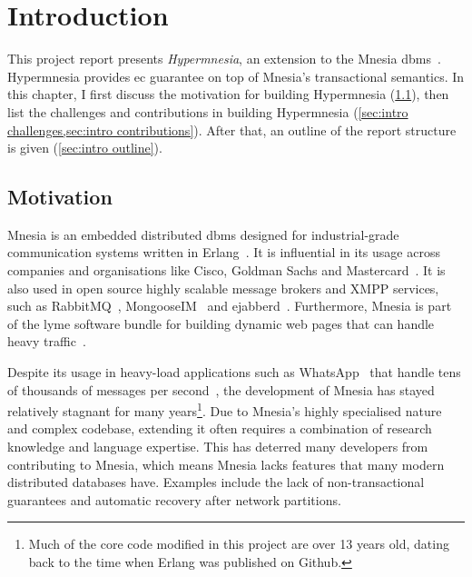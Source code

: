 \section{Introduction} \label{sec:intro}




This project report presents \emph{Hypermnesia}, an extension to the
Mnesia \acrfull{dbms}~\cite{ericssonab2023mnesiaguide}. 
Hypermnesia provides \acrfull{ec} 
guarantee on top of Mnesia's transactional semantics. 
In this chapter, I first discuss the motivation for building 
Hypermnesia (\cref{sec:intro motivation}), then list the challenges and contributions
in building Hypermnesia (\cref{sec:intro challenges,sec:intro contributions}). 
After that, an outline of the report structure is given (\cref{sec:intro outline}).


\subsection{Motivation} \label{sec:intro motivation}

Mnesia is an embedded distributed \acrfull{dbms} designed for industrial-grade
communication systems written in Erlang~\cite{ericssonab2023mnesiaguide}. It is
influential in its usage across companies and organisations like Cisco,
Goldman Sachs and Mastercard~\cite{cesarini2019erlang}.
It is also used in open source highly scalable message brokers and XMPP services, such as 
RabbitMQ~\cite{vmware2023rabbitmq}, MongooseIM~\cite{erlangsolutions2023MongooseIM} and 
ejabberd~\cite{processone2023ejabberd}. Furthermore, Mnesia is part of the \acrfull{lyme}
software bundle for building dynamic web pages that can handle heavy 
traffic~\cite{wikipediacontributors2020LYME}.

Despite its usage in heavy-load applications such as WhatsApp~\cite{vorontsov2018forgETS}
that handle tens of thousands of messages per second~\cite{levy2022RabbitMQvsKafka}, the development of Mnesia has stayed
relatively stagnant for many years\footnote{Much of the core code modified in this 
project are over 13 years old, dating back to the time when Erlang was published on Github.}.
Due to Mnesia's highly specialised nature and complex codebase, extending it often requires
a combination of research knowledge and language expertise. This has
deterred many developers from contributing to Mnesia,
which means Mnesia lacks features that many modern distributed databases have. 
Examples include the lack of non-transactional
guarantees and automatic recovery after network partitions.

